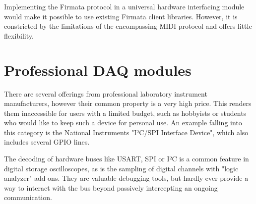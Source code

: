 Implementing the Firmata protocol in a universal hardware interfacing module would make it possible to use existing Firmata client libraries. However, it is constricted by the limitations of the encompassing MIDI protocol and offers little flexibility.

\section{Professional DAQ modules}

There are several offerings from professional laboratory instrument manufacturers, however their common property is a very high price. This renders them inaccessible for users with a limited budget, such as hobbyists or students who would like to keep such a device for personal use. An example falling into this category is the National Instruments "I²C/SPI Interface Device", which also includes several GPIO lines. 


The decoding of hardware buses like USART, SPI or I²C is a common feature in digital storage oscilloscopes, as is the sampling of digital channels with "logic analyzer" add-ons. They are valuable debugging tools, but hardly ever provide a way to interact with the bus beyond passively intercepting an ongoing communication.
